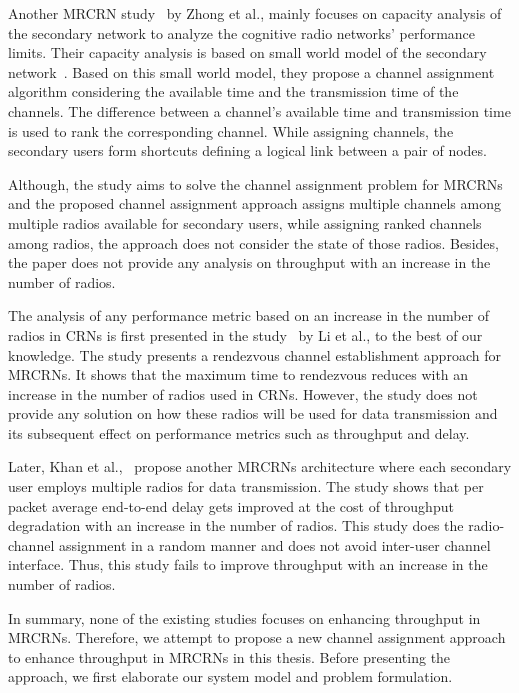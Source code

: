 Another MRCRN study~\cite{zhong2014capacity} by Zhong et al., mainly focuses on capacity analysis of the secondary network to analyze the cognitive radio networks' performance limits. Their capacity analysis is based on small world model of the secondary network~\cite{watts1998collective}. Based on this small world model, they propose a channel assignment algorithm considering the available time and the transmission time of the channels. The difference between a channel's available time and transmission time is used to rank the corresponding channel. While assigning channels, the secondary users form shortcuts defining a logical link between a pair of nodes.

Although, the study aims to solve the channel assignment problem for MRCRNs and the proposed channel assignment approach assigns multiple channels among multiple radios available for secondary users, while assigning ranked channels among radios, the approach does not consider the state of those radios. Besides, the paper does not provide any analysis on throughput with an increase in the number of radios.

The analysis of any performance metric based on an increase in the number of radios in CRNs is first presented in the study~\cite{li2014deterministic} by Li et al., to the best of our knowledge. The study presents a rendezvous channel establishment approach for MRCRNs. It shows that the maximum time to rendezvous reduces with an increase in the number of radios used in CRNs. However, the study does not provide any solution on how these radios will be used for data transmission and its subsequent effect on performance metrics such as throughput and delay.

Later, Khan et al.,~\cite{khan2015towards} propose another MRCRNs architecture where each secondary user employs multiple radios for data transmission. The study shows that per packet average end-to-end delay gets improved at the cost of throughput degradation with an increase in the number of radios. This study does the radio-channel assignment in a random manner and does not avoid inter-user channel interface. Thus, this study fails to improve throughput with an increase in the number of radios.

In summary, none of the existing studies focuses on enhancing throughput in MRCRNs. Therefore, we attempt to propose a new channel assignment approach to enhance throughput in MRCRNs in this thesis. Before presenting the approach, we first elaborate our system model and problem formulation.
\endinput
